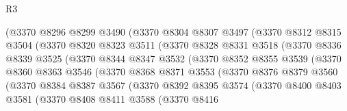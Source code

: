 \begin{lexlean}{R3}
\begin{coremodule}
                    (@3370
                      @8296
                      @8299
                      @3490
                      (@3370
                        @8304
                        @8307
                        @3497
                        (@3370
                          @8312
                          @8315
                          @3504
                          (@3370
                            @8320
                            @8323
                            @3511
                            (@3370
                              @8328
                              @8331
                              @3518
                              (@3370
                                @8336
                                @8339
                                @3525
                                (@3370
                                  @8344
                                  @8347
                                  @3532
                                  (@3370
                                    @8352
                                    @8355
                                    @3539
                                    (@3370
                                      @8360
                                      @8363
                                      @3546
                                      (@3370
                                        @8368
                                        @8371
                                        @3553
                                        (@3370
                                          @8376
                                          @8379
                                          @3560
                                          (@3370
                                            @8384
                                            @8387
                                            @3567
                                            (@3370
                                              @8392
                                              @8395
                                              @3574
                                              (@3370
                                                @8400
                                                @8403
                                                @3581
                                                (@3370
                                                  @8408
                                                  @8411
                                                  @3588
                                                  (@3370
                                                    @8416

\end{coremodule}
\end{lexlean}
